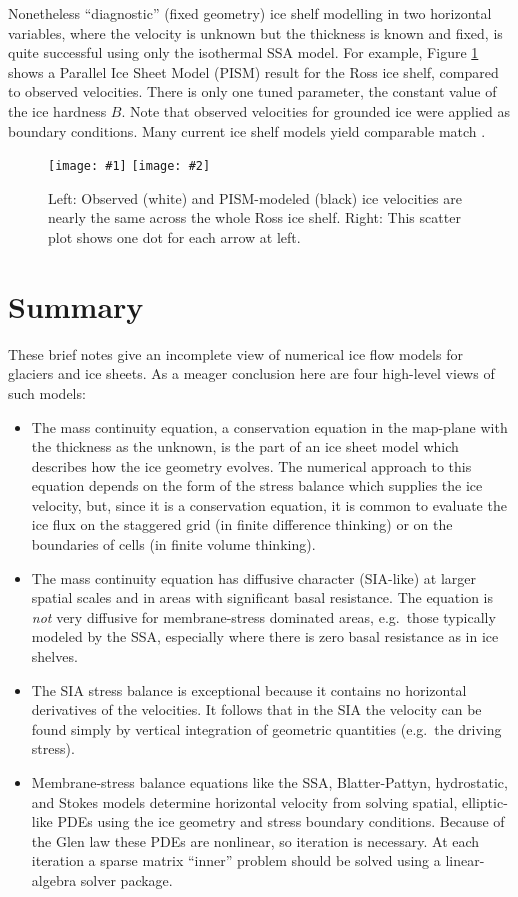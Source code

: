 \documentclass[letterpaper,final,12pt,reqno]{amsart}
\newcommand{\twofigsizes}[5]{
\begin{figure}[ht]
\centering
\texttt{[image: \#1]} \quad
\texttt{[image: \#2]}
\caption{#3}
\label{fig:#1}
\end{figure}}
\begin{document}
Nonetheless ``diagnostic'' (fixed geometry) ice shelf modelling in two horizontal variables, where the velocity is unknown but the thickness is known and fixed, is quite successful using only the isothermal SSA model.  For example, Figure \ref{fig:rossquiver} shows a Parallel Ice Sheet Model (PISM) result for the Ross ice shelf, compared to observed velocities.  There is only one tuned parameter, the constant value of the ice hardness $B$.  Note that observed velocities for grounded ice were applied as boundary conditions.  Many current ice shelf models yield comparable match \cite{MacAyealetal}.

\twofigsizes{rossquiver}{rossscatter}{Left: Observed (white) and PISM-modeled (black) ice velocities are nearly the same across the whole Ross ice shelf.  Right: This scatter plot shows one dot for each arrow at left.}{2.85in}{3.0in}


\section{Summary} \label{sec:summary}

These brief notes give an incomplete view of numerical ice flow models for glaciers and ice sheets.  As a meager conclusion here are four high-level views of such models:
\begin{itemize}
\item The mass continuity equation, a conservation equation in the map-plane with the thickness as the unknown, is the part of an ice sheet model which describes how the ice geometry evolves.  The numerical approach to this equation depends on the form of the stress balance which supplies the ice velocity, but, since it is a conservation equation, it is common to evaluate the ice flux on the staggered grid (in finite difference thinking) or on the boundaries of cells (in finite volume thinking).
\item The mass continuity equation has diffusive character (SIA-like) at larger spatial scales and in areas with significant basal resistance.  The equation is \emph{not} very diffusive for membrane-stress dominated areas, e.g.~those typically modeled by the SSA, especially where there is zero basal resistance as in ice shelves.
\item The SIA stress balance is exceptional because it contains no horizontal derivatives of the velocities.  It follows that in the SIA the velocity can be found simply by vertical integration of geometric quantities (e.g.~the driving stress).
\item Membrane-stress balance equations like the SSA, Blatter-Pattyn, hydrostatic, and Stokes models determine horizontal velocity from solving spatial, elliptic-like PDEs using the ice geometry and stress boundary conditions.  Because of the Glen law these PDEs are nonlinear, so iteration is necessary.  At each iteration a sparse matrix ``inner'' problem should be solved using a linear-algebra solver package.
\end{itemize}
\end{document}
